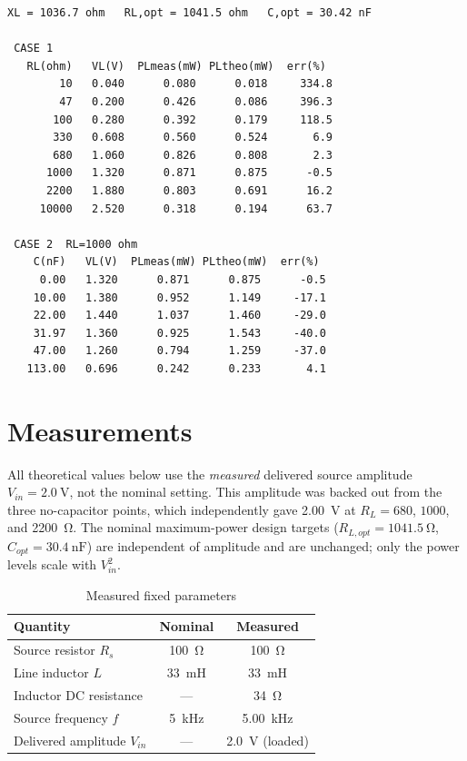 \documentclass[11pt]{article}
\begin{document}


\begin{lstlisting}[caption={SciLab runtime output (abridged)}]
 XL = 1036.7 ohm   RL,opt = 1041.5 ohm   C,opt = 30.42 nF

 CASE 1
   RL(ohm)   VL(V)  PLmeas(mW) PLtheo(mW)  err(%)
        10   0.040      0.080      0.018     334.8
        47   0.200      0.426      0.086     396.3
       100   0.280      0.392      0.179     118.5
       330   0.608      0.560      0.524       6.9
       680   1.060      0.826      0.808       2.3
      1000   1.320      0.871      0.875      -0.5
      2200   1.880      0.803      0.691      16.2
     10000   2.520      0.318      0.194      63.7

 CASE 2  RL=1000 ohm
    C(nF)   VL(V)  PLmeas(mW) PLtheo(mW)  err(%)
     0.00   1.320      0.871      0.875      -0.5
    10.00   1.380      0.952      1.149     -17.1
    22.00   1.440      1.037      1.460     -29.0
    31.97   1.360      0.925      1.543     -40.0
    47.00   1.260      0.794      1.259     -37.0
   113.00   0.696      0.242      0.233       4.1
\end{lstlisting}

\section*{Measurements}

All theoretical values below use the \emph{measured} delivered source amplitude
$V_{in} = \SI{2.0}{\volt}$, not the nominal setting. This amplitude was backed
out from the three no-capacitor points, which independently gave
\SI{2.00}{\volt} at $R_L = 680$, $1000$, and \SI{2200}{\ohm}. The nominal
maximum-power design targets ($R_{L,opt} = \SI{1041.5}{\ohm}$,
$C_{opt} = \SI{30.4}{\nano\farad}$) are independent of amplitude and are
unchanged; only the power levels scale with $V_{in}^2$.

\begin{table}[H]
    \centering
    \caption{Measured fixed parameters}
    \begin{tabular}{lcc}
        \toprule
        Quantity & Nominal & Measured \\
        \midrule
        Source resistor $R_s$        & \SI{100}{\ohm}        & \SI{100}{\ohm} \\
        Line inductor $L$            & \SI{33}{\milli\henry} & \SI{33}{\milli\henry} \\
        Inductor DC resistance       & ---                   & \SI{34}{\ohm} \\
        Source frequency $f$         & \SI{5}{\kilo\hertz}   & \SI{5.00}{\kilo\hertz} \\
        Delivered amplitude $V_{in}$ & ---                   & \SI{2.0}{\volt} (loaded) \\
        \bottomrule
    \end{tabular}
\end{table}
\end{document}

